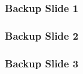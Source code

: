\documentclass{beamer}
\newcommand{\backupend}{
   \setcounter{framenumber}{\value{finalframe}}
}
\begin{document}
\begin{frame}
\frametitle{Backup Slide 1}

\end{frame}


\begin{frame}
\frametitle{Backup Slide 2}

\end{frame}


\begin{frame}
\frametitle{Backup Slide 3}

\end{frame}


\backupend
\end{document}
